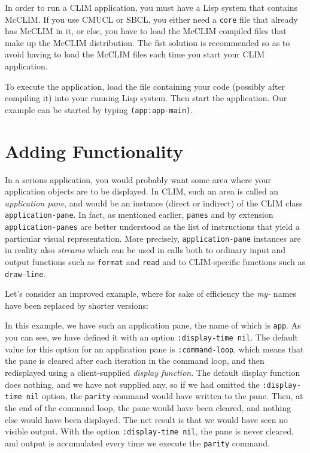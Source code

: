 In order to run a CLIM application, you must have a Lisp system that
contains McCLIM.  If you use CMUCL or SBCL, you either need a
\texttt{core} file that already has McCLIM in it, or else, you have to
load the McCLIM compiled files that make up the McCLIM distribution.
The fist solution is recommended so as to avoid having to load the
McCLIM files each time you start your CLIM application.

To execute the application, load the file containing your code
(possibly after compiling it) into your running Lisp system.  Then
start the application.  Our example can be started by typing
\texttt{(app:app-main)}.

\section{Adding Functionality}

In a serious application, you would probably want some area where your
application objects are to be displayed.  In CLIM, such an area is
called an \emph{application pane}, and would be an instance (direct or
indirect) of the CLIM class \texttt{application-pane}.  In fact, as
mentioned earlier, \texttt{panes} and by extension
\texttt{application-panes} are better understood as the list of
instructions that yield a particular visual representation. More
precisely, \texttt{application-pane} instances are in reality also
\emph{streams} which can be used in calls both to ordinary input and
output functions such as \texttt{format} and \texttt{read} and to
CLIM-specific functions such as \texttt{draw-line}.

Let's consider an improved example, where for sake of efficiency the
\emph{my-} names have been replaced by shorter versions:




In this example, we have such an application pane, the name of which
is \texttt{app}.  As you can see, we have defined it with an option
\texttt{:display-time nil}.  The default value for this option for an
application pane is \texttt{:command-loop}, which means that the pane
is cleared after each iteration in the command loop, and then
redisplayed using a client-supplied \emph{display function}.  The
default display function does nothing, and we have not supplied any,
so if we had omitted the \texttt{:display-time nil} option, the
\texttt{parity} command would have written to the pane.  Then, at the
end of the command loop, the pane would have been cleared, and nothing
else would have been displayed.  The net result is that we would have
seen no visible output.  With the option \texttt{:display-time nil},
the pane is never cleared, and output is accumulated every time we
execute the \texttt{parity} command.

